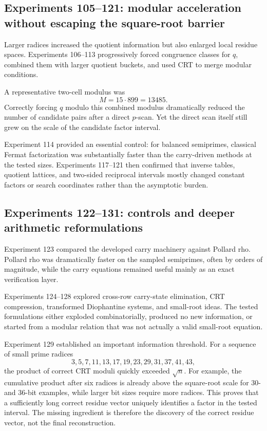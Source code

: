 \documentclass[11pt,a4paper]{article}
\begin{document}
\subsection{Experiments 105--121: modular acceleration without escaping the square-root barrier}
Larger radices increased the quotient information but also enlarged local residue spaces. Experiments 106--113 progressively forced congruence classes for \(q\), combined them with larger quotient buckets, and used CRT to merge modular conditions.

A representative two-cell modulus was
\[
M=15\cdot899=13485.
\]
Correctly forcing \(q\) modulo this combined modulus dramatically reduced the number of candidate pairs after a direct \(p\)-scan. Yet the direct scan itself still grew on the scale of the candidate factor interval.

Experiment 114 provided an essential control: for balanced semiprimes, classical Fermat factorization was substantially faster than the carry-driven methods at the tested sizes. Experiments 117--121 then confirmed that inverse tables, quotient lattices, and two-sided reciprocal intervals mostly changed constant factors or search coordinates rather than the asymptotic burden.

\subsection{Experiments 122--131: controls and deeper arithmetic reformulations}
Experiment 123 compared the developed carry machinery against Pollard rho. Pollard rho was dramatically faster on the sampled semiprimes, often by orders of magnitude, while the carry equations remained useful mainly as an exact verification layer.

Experiments 124--128 explored cross-row carry-state elimination, CRT compression, transformed Diophantine systems, and small-root ideas. The tested formulations either exploded combinatorially, produced no new information, or started from a modular relation that was not actually a valid small-root equation.

Experiment 129 established an important information threshold. For a sequence of small prime radices
\[
3,5,7,11,13,17,19,23,29,31,37,41,43,
\]
the product of correct CRT moduli quickly exceeded \(\sqrt n\). For example, the cumulative product after six radices is already above the square-root scale for 30- and 36-bit examples, while larger bit sizes require more radices. This proves that a sufficiently long correct residue vector uniquely identifies a factor in the tested interval. The missing ingredient is therefore the discovery of the correct residue vector, not the final reconstruction.
\end{document}
